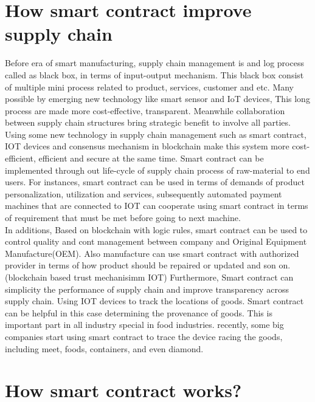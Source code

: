 \section{How smart contract improve supply chain}
Before era of smart manufacturing, supply chain management is and log process called as black box, in terms of input-output mechanism. This black box consist of multiple mini process related to product, services, customer and
etc. Many possible by emerging new technology like smart sensor and IoT devices, This long process are made more cost-effective, transparent. Meanwhile collaboration between supply chain structures bring strategic benefit to involve all parties.\\
Using some new technology in supply chain management such as smart contract, IOT devices and consensus mechanism in blockchain make this system more cost-efficient, efficient and secure at the same time. Smart contract can be implemented through out life-cycle of supply chain process of raw-material to end users. For instances, smart contract can be used in terms of demands of product personalization, utilization and services, subsequently automated payment machines that are connected to IOT can cooperate using smart contract in terms of requirement that must be met before going to next machine.\\
In additions, Based on blockchain with logic rules, smart contract can be used to control quality and cont management between company and Original Equipment Manufacture(OEM). Also manufacture can use smart contract with authorized provider in terms of how product should be repaired or updated and son on.\\ (blockchain based trust mechanisimm IOT)
Furthermore, Smart contract can simplicity the performance of supply chain and improve transparency across supply chain. Using IOT devices to track the locations  of goods. Smart contract can be helpful in this case determining the provenance of goods. This is important part in all industry special in food industries. recently, some big companies start using smart contract to trace the device racing the goods, including meet, foods, containers, and even diamond\cite{Adam}.

\section{How smart contract works?}

